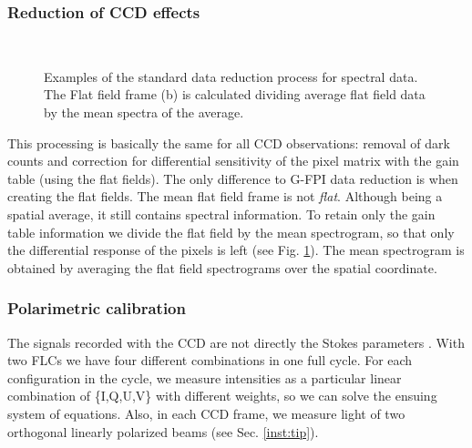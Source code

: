 \subsubsection*{Reduction of CCD effects}
\begin{figure}[t]
  \centering
  \quad%
    \\
  \quad%
  \quad%
    \caption{Examples of the standard data reduction process for spectral data. The Flat field frame (b) is calculated dividing average flat field data by the mean spectra of the average. %
    }
\label{tip:flat}
\end{figure}

This processing is basically the same for all CCD observations: removal of dark counts and correction for differential sensitivity of the pixel matrix with the gain table (using the flat fields). The only difference to G-FPI data reduction is when creating the flat fields. The mean flat field frame is not \emph{flat}. Although being a spatial average, it still contains spectral information. To retain only the gain table information we divide the flat field by the mean spectrogram, so that only the differential response of the pixels is left (see Fig. \ref{tip:flat}). The mean spectrogram is obtained by averaging the flat field spectrograms over the spatial coordinate.




\subsubsection*{Polarimetric calibration}
The signals recorded with the CCD are not directly the Stokes parameters \cite[see description in e.g. ][]{Chandrasekhar:1960lr} . With two FLCs we have four different combinations in one full cycle. For each configuration in the cycle, we measure intensities as a particular linear combination of \{I,Q,U,V\} with different weights, so we can solve the ensuing system of equations. Also, in each CCD frame, we measure light of two orthogonal linearly polarized beams (see Sec. \ref{inst:tip}).

